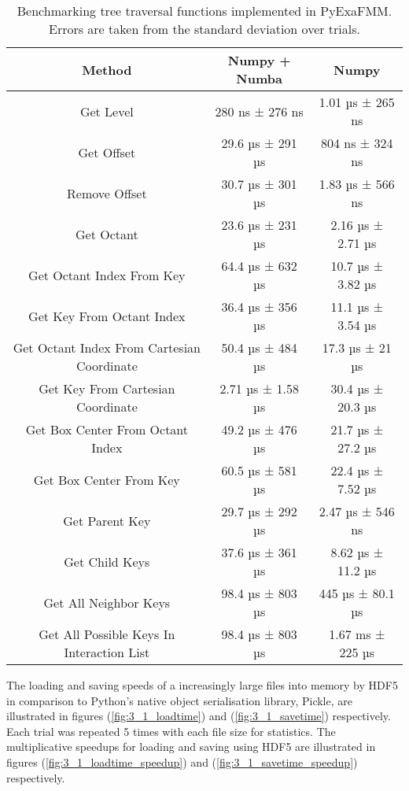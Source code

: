 \begin{table}[ht]
    \centering %
    \begin{tabular}{c c c} %
    \hline\hline %
    Method & Numpy + Numba & Numpy \\ [0.5ex] %
    \hline %
    Get Level & 280 ns ± 276 ns  & 1.01 µs ± 265 ns \\ %
    Get Offset & 29.6 µs ± 291 µs & 804 ns ± 324 ns \\
    Remove Offset & 30.7 µs ± 301 µs & 1.83 µs ± 566 ns \\
    Get Octant & 23.6 µs ± 231 µs & 2.16 µs ± 2.71 µs \\
    Get Octant Index From Key & 64.4 µs ± 632 µs & 10.7 µs ± 3.82 µs \\
    Get Key From Octant Index & 36.4 µs ± 356 µs & 11.1 µs ± 3.54 µs \\
    Get Octant Index From Cartesian Coordinate & 50.4 µs ± 484 µs & 17.3 µs ± 21 µs \\
    Get Key From Cartesian Coordinate & 2.71 µs ± 1.58 µs & 30.4 µs ± 20.3 µs \\
    Get Box Center From Octant Index & 49.2 µs ± 476 µs & 21.7 µs ± 27.2 µs \\
    Get Box Center From Key & 60.5 µs ± 581 µs & 22.4 µs ± 7.52 µs \\
    Get Parent Key & 29.7 µs ± 292 µs & 2.47 µs ± 546 ns \\
    Get Child Keys & 37.6 µs ± 361 µs & 8.62 µs ± 11.2 µs \\
    Get All Neighbor Keys & 98.4 µs ± 803 µs & 445 µs ± 80.1 µs\\
    Get All Possible Keys In Interaction List & 98.4 µs ± 803 µs & 1.67 ms ± 225 µs \\ [1ex] %
    \hline %
    \end{tabular}
    \label{table:3_1_jit} %
    \caption{
        Benchmarking tree traversal functions implemented in \gls{PyExaFMM}.
        Errors are taken from the standard deviation over trials.
        } %
\end{table}


The loading and saving speeds of a increasingly large files into memory by
HDF5 in comparison to Python's native object serialisation library, Pickle,
are illustrated in figures (\ref{fig:3_1_loadtime}) and (\ref{fig:3_1_savetime})
respectively. Each trial was repeated 5 times with each file size for statistics.
The multiplicative speedups for loading and saving using HDF5 are illustrated
in figures (\ref{fig:3_1_loadtime_speedup}) and (\ref{fig:3_1_savetime_speedup})
respectively.

